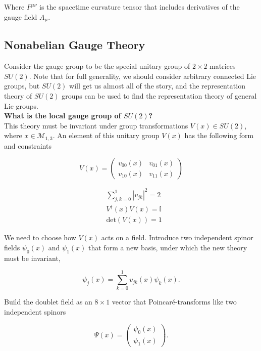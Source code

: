 \noindent Where $F^{\mu\nu}$ is the spacetime curvature tensor that includes derivatives of the gauge field $A_\mu$. \\

\subsection*{Nonabelian Gauge Theory}

\noindent Consider the gauge group to be the special unitary group of $2 \times 2$ matrices $SU(2)$. Note that for full generality, we should consider arbitrary connected Lie groups, but $SU(2)$ will get us almost all of the story, and the representation theory of $SU(2)$ groups can be used to find the representation theory of general Lie groups. \\

\noindent \textbf{What is the local gauge group of $SU(2)$?} \\

\noindent This theory must be invariant under group transformations $V(x) \in SU(2)$, where $x \in \mathcal{M}_{1,3}$. An element of this unitary group $V(x)$ has the following form and constraints

\begin{equation}
V(x) = \left(
\begin{array}{cc}
v_{00} (x) & v_{01} (x) \\
v_{10} (x) & v_{11} (x)
\end{array} \right)
\end{equation}

\begin{align*}
&\sum_{j,k=0}^1 |v_{jk}|^2 = 2 \\
& V^\dagger (x) V (x) = \mathbb{I} \\
& \text{det}(V(x)) = 1
\end{align*}

\noindent We need to choose how $V(x)$ acts on a field. Introduce two independent spinor fields $\psi_0 (x)$ and $\psi_1 (x)$ that form a new basis, under which the new theory must be invariant,

\begin{equation}
\psi_j (x) = \sum_{k=0}^1 v_{jk} (x) \psi_k (x).
\end{equation}

\noindent Build the doublet field as an $8 \times 1$ vector that Poincar\'e-transforms like two independent spinors

\begin{equation}
\Psi (x) = \left( \begin{array}{c} \psi_0 (x) \\ \psi_1 (x) \end{array} \right).
\end{equation}

